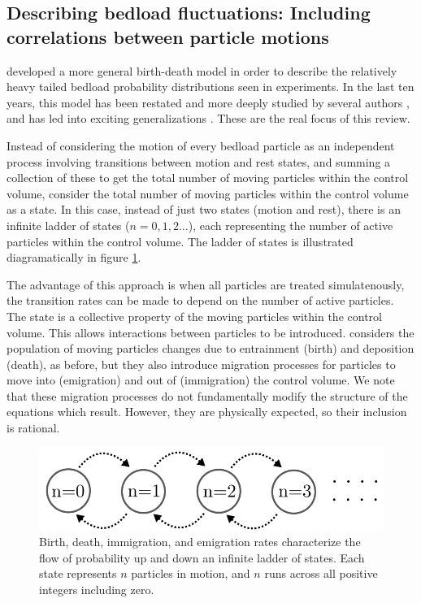 \subsection{Describing bedload fluctuations: Including correlations between particle motions} 
\label{sec:ancey2008}

\citet{Ancey2006a, Ancey2008} developed a more general birth-death model in order to describe the relatively heavy tailed bedload probability distributions seen in experiments. 
In the last ten years, this model has been restated and more deeply studied by several authors \citep{Turowski2010, Heyman2013, Heyman2014a, Heyman2014, Ma2014}, and has led into exciting generalizations \citep{Turowski2010, Ancey2014, Ancey2015}. 
These are the real focus of this review. 

Instead of considering the motion of every bedload particle as an independent process involving transitions between motion and rest states, and summing a collection of these to get the total number of moving particles within the control volume, \citet{Ancey2008} consider the total number of moving particles within the control volume as a state.
In this case, instead of just two states (motion and rest), there is an infinite ladder of states ($n = 0,1,2 \dots$), each representing the number of active particles within the control volume.
The ladder of states is illustrated diagramatically in figure \ref{fig:ladder}. 

The advantage of this approach is when all particles are treated simulatenously, the transition rates can be made to depend on the number of active particles. 
The state is a collective property of the moving particles within the control volume. 
This allows interactions between particles to be introduced. 
\citet{Ancey2008} considers the population of moving particles changes due to entrainment (birth) and deposition (death), as before, but they also introduce migration processes for particles to move into (emigration) and out of (immigration) the control volume.
We note that these migration processes do not fundamentally modify the structure of the equations which result.
However, they are physically expected, so their inclusion is rational.

\begin{figure}
  \includegraphics[width=.98\linewidth]{./figures/ancey2008.png}
  \caption{Birth, death, immigration, and emigration rates characterize the flow of probability up and down an infinite ladder of states. Each state represents $n$ particles in motion, and $n$ runs across all positive integers including zero. \label{fig:ladder} }
\end{figure} 

